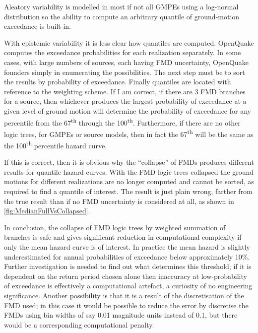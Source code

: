 \documentclass{article}
\begin{document}
Aleatory variability is modelled in most if not all GMPEs using a log-normal distribution so the ability to compute an arbitrary quantile of ground-motion exceedance is built-in. 

With epistemic variability it is less clear how quantiles are computed. OpenQuake computes the exceedance probabilities for each realization separately. In some cases, with large numbers of sources, each having FMD uncertainty, OpenQuake founders simply in enumerating the possibilities. The next step must be to sort the results by probability of exceedance. Finally quantiles are located with reference to the weighting scheme. If I am correct, if there are 3 FMD branches for a source, then whichever produces the largest probability of exceedance at a given level of ground motion will determine the probability of exceedance for any percentile from the 67\textsuperscript{th} through the 100\textsuperscript{th}. Furthermore, if there are no other logic trees, for GMPEs or source models, then in fact the 67\textsuperscript{th} will be the same as the 100\textsuperscript{th} percentile hazard curve.

If this is correct, then it is obvious why the ``collapse'' of FMDs produces different results for quantile hazard curves. With the FMD logic trees collapsed the ground motions for different realizations are no longer computed and cannot be sorted, as required to find a quantile of interest. The result is just plain wrong, farther from the true result than if no FMD uncertainty is considered at all, as shown in \autoref{fig:MedianFullVsCollapsed}.

In conclusion, the collapse of FMD logic trees by weighted summation of branches is safe and gives significant reduction in computational complexity if only the mean hazard curve is of interest. In practice the mean hazard is slightly underestimated for annual probabilities of exceedance below approximately 10\%. Further investigation is needed to find out what determines this threshold; if it is dependent on the return period chosen alone then inaccuracy at low-probability of exceedance is effectively a computational artefact, a curiosity of no engineering significance. Another possibility is that it is a result of the discretisation of the FMD used; in this case it would be possible to reduce the error by discretise the FMDs using bin widths of say 0.01 magnitude units instead of 0.1, but there would be a corresponding computational penalty.



\end{document}
